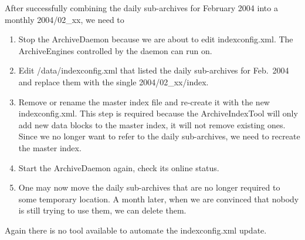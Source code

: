 After successfully combining the daily sub-archives for February 2004
into a monthly 2004/02\_xx, we need to
\begin{enumerate}
\item Stop the ArchiveDaemon because we are about to edit
      indexconfig.xml.
      The ArchiveEngines controlled by the daemon can run on.
\item Edit /data/indexconfig.xml that listed the daily sub-archives for
      Feb.\ 2004 and replace them with the single 2004/02\_xx/index.
\item Remove or rename the master index file and re-create it with the new
      indexconfig.xml. This step is required because the ArchiveIndexTool
      will only add new data blocks to the master index, it will not
      remove existing ones. Since we no longer want to refer to the
      daily sub-archives, we need to recreate the master index.
\item Start the ArchiveDaemon again, check its online status.
\item One may now move the daily sub-archives that are no longer
      required to some temporary location. A month later, when we are
      convinced that nobody is still trying to use them, we can delete
      them.
\end{enumerate}

\noindent Again there is no tool available to automate the
indexconfig.xml update.
